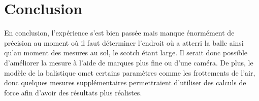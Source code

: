 \documentclass[11pt]{article}
\begin{document}
\section{Conclusion}
En conclusion, l’expérience s’est bien passée mais manque énormément de précision au moment où il faut déterminer l’endroit où a atterri la balle ainsi qu’au moment des mesures au sol, le scotch étant large. Il serait donc possible d’améliorer la mesure à l’aide de marques plus fine ou d'une caméra. De plus, le modèle de la balistique omet certains paramètres comme les frottements de l'air, donc quelques mesures supplémentaires permettraient d'utiliser des calculs de force afin d'avoir des résultats plus réalistes.  

\clearpage
\end{document}

